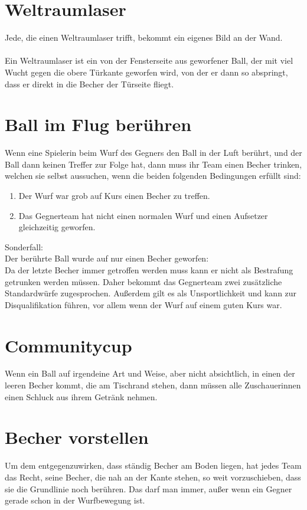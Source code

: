 \documentclass[a5paper, 12pt]{book}
\begin{document}
\section{Weltraumlaser}\label{weltraumlaser}
Jede, die einen Weltraumlaser trifft, bekommt ein eigenes Bild an der Wand. \\\\ Ein Weltraumlaser ist ein von der Fensterseite aus geworfener Ball, der mit viel Wucht gegen die obere Türkante geworfen wird, von der er dann so abspringt, dass er direkt in die Becher der Türseite fliegt. 
\section{Ball im Flug berühren}\label{ballimflugberühren}
Wenn eine Spielerin beim Wurf des Gegners den Ball in der Luft berührt, und der Ball dann keinen Treffer zur Folge hat, dann muss ihr Team einen Becher trinken, welchen sie selbst aussuchen, wenn die beiden folgenden Bedingungen erfüllt sind:
\begin{enumerate}[(1)]
    \item Der Wurf war grob auf Kurs einen Becher zu treffen.
    \item Das Gegnerteam hat nicht einen normalen Wurf und einen Aufsetzer gleichzeitig geworfen.
\end{enumerate}

Sonderfall: \\Der berührte Ball wurde auf nur einen Becher geworfen:\\
	Da der letzte Becher immer getroffen werden muss kann er nicht als Bestrafung getrunken werden müssen. Daher bekommt das Gegnerteam zwei zusätzliche Standardwürfe zugesprochen. 
Außerdem gilt es als Unsportlichkeit und kann zur Disqualifikation führen, vor allem wenn der Wurf auf einem guten Kurs war.

\section{Communitycup}\label{communitycup}
Wenn ein Ball auf irgendeine Art und Weise, aber nicht absichtlich, in einen der leeren Becher kommt, die am Tischrand stehen, dann müssen alle Zuschauerinnen einen Schluck aus ihrem Getränk nehmen.
\section{Becher vorstellen}\label{bechervorstellen}
Um dem entgegenzuwirken, dass ständig Becher am Boden liegen, hat jedes Team das Recht, seine Becher, die nah an der Kante stehen, so weit vorzuschieben, dass sie die Grundlinie noch berühren. 
Das darf man immer, außer wenn ein Gegner gerade schon in der Wurfbewegung ist. 
\end{document}
